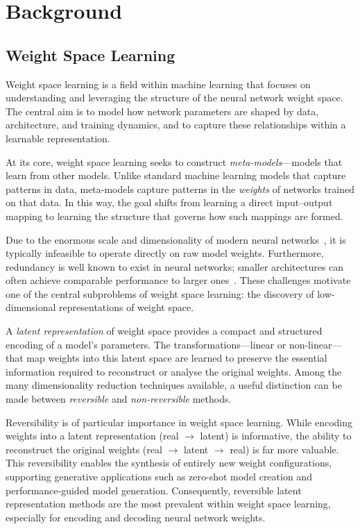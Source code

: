 \chapter{Background}

\section{Weight Space Learning}

Weight space learning is a field within machine learning that focuses on understanding and leveraging the structure of the neural network weight space. The central aim is to model how network parameters are shaped by data, architecture, and training dynamics, and to capture these relationships within a learnable representation. 

At its core, weight space learning seeks to construct \textit{meta-models}—models that learn from other models. Unlike standard machine learning models that capture patterns in data, meta-models capture patterns in the \textit{weights} of networks trained on that data. In this way, the goal shifts from learning a direct input–output mapping to learning the structure that governs how such mappings are formed.

Due to the enormous scale and dimensionality of modern neural networks~\cite{}, it is typically infeasible to operate directly on raw model weights. Furthermore, redundancy is well known to exist in neural networks; smaller architectures can often achieve comparable performance to larger ones~\cite{}. These challenges motivate one of the central subproblems of weight space learning: the discovery of low-dimensional representations of weight space.

A \textit{latent representation} of weight space provides a compact and structured encoding of a model’s parameters. The transformations—linear or non-linear—that map weights into this latent space are learned to preserve the essential information required to reconstruct or analyse the original weights. Among the many dimensionality reduction techniques available, a useful distinction can be made between \textit{reversible} and \textit{non-reversible} methods.

Reversibility is of particular importance in weight space learning. While encoding weights into a latent representation (real $\rightarrow$ latent) is informative, the ability to reconstruct the original weights (real $\rightarrow$ latent $\rightarrow$ real) is far more valuable. This reversibility enables the synthesis of entirely new weight configurations, supporting generative applications such as zero-shot model creation and performance-guided model generation. Consequently, reversible latent representation methods are the most prevalent within weight space learning, especially for encoding and decoding neural network weights.

